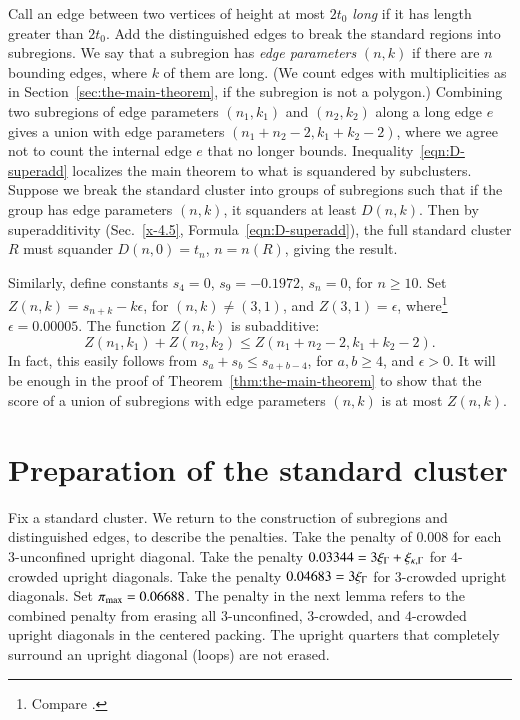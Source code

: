 Call an edge between two vertices of height at most $2t_0$ {\it long\/}
if it has length greater than $2t_0$. Add the distinguished edges to
break the standard regions into subregions. We say that a subregion has
{\it edge parameters} $(n,k)$ if there are $n$ bounding edges, where $k$
of them are long. (We count edges with multiplicities as in
Section~\ref{sec:the-main-theorem}, if the subregion is not a polygon.)
Combining two subregions of edge parameters $(n_1,k_1)$ and $(n_2,k_2)$
along a long edge $e$ gives a union with edge parameters
$(n_1+n_2-2,k_1+k_2-2)$, where we agree not to count the internal edge
$e$ that no longer bounds. Inequality~\ref{eqn:D-superadd} localizes the
main theorem to what is squandered by subclusters. Suppose we break the
standard cluster into groups of subregions such that if the group has
edge parameters $(n,k)$, it squanders at least $D(n,k)$. Then by
superadditivity (Sec.~\ref{x-4.5}, Formula~\ref{eqn:D-superadd}), the
full standard cluster $R$ must squander $D(n,0) = t_n$, $n=n(R)$, giving
the result.

Similarly, define constants $s_4=0$, $s_9 = -0.1972$, $s_{n}=0$, for
$n\ge10$.  Set $Z(n,k) = s_{n+k}-k\epsilon$, for $(n,k)\ne (3,1)$, and
$Z(3,1)=\epsilon$, where\footnote{Compare .} %
 $\epsilon=0.00005$. The function
$Z(n,k)$ is subadditive:
    $$Z(n_1,k_1)+Z(n_2,k_2) \le Z(n_1+n_2-2,k_1+k_2-2).$$
In fact, this easily follows from $s_a+s_b\le s_{a+b-4}$, for $a,b\ge
4$, and $\epsilon>0$. It will be enough in the proof of
Theorem~\ref{thm:the-main-theorem} to show that the score of a union of
subregions with edge parameters $(n,k)$ is at most $Z(n,k)$.


\section{Preparation of the standard cluster} %
   \label{sec:prep-cluster}

Fix a standard cluster.  We return to the construction of
subregions and distinguished edges, to describe the penalties.
Take the penalty of $0.008$ for each $3$-unconfined upright
diagonal. Take the penalty $0.03344 = 3\xi_\Gamma+\xi_{\kappa,\Gamma}$ for $4$-crowded
upright diagonals. Take the penalty $0.04683=3\xi_\Gamma$ for
$3$-crowded upright diagonals. Set $\pi_{\max}=0.06688$. The penalty
in the next lemma refers to the combined penalty from erasing all
$3$-unconfined, $3$-crowded, and $4$-crowded upright diagonals in
the centered packing. The upright quarters that completely
surround an upright diagonal (loops) are not erased.

